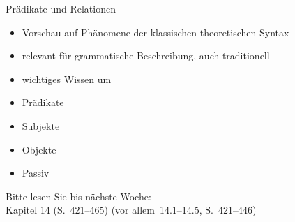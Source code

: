 \begin{frame}
  {Prädikate und Relationen}
  \pause
  \begin{itemize}[<+->]
    \item Vorschau auf Phänomene der klassischen theoretischen Syntax
    \item \alert{relevant für grammatische Beschreibung}, auch traditionell
    \item wichtiges Wissen um 
      \Halbzeile
    \item Prädikate
    \item Subjekte
    \item Objekte
    \item \alert{Passiv}
  \end{itemize}
  \pause
  \Halbzeile
  \begin{center}
    Bitte lesen Sie bis nächste Woche:\\
    \alert{Kapitel 14 (S.~421--465)} (vor allem 14.1--14.5, S.~421--446)
  \end{center}
  \pause
  \pause
  \pause
  \pause
  \pause
\end{frame}
